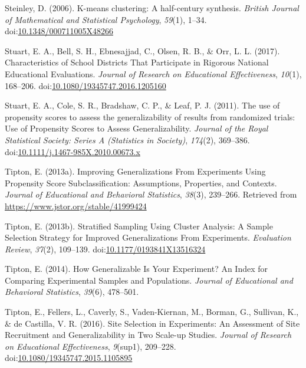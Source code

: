 \documentclass[man,floatsintext]{apa6}
\begin{document}
\leavevmode\hypertarget{ref-steinleyKmeansClusteringHalfcentury2006}{}%
Steinley, D. (2006). K-means clustering: A half-century synthesis. \emph{British Journal of Mathematical and Statistical Psychology}, \emph{59}(1), 1--34. doi:\href{https://doi.org/10.1348/000711005X48266}{10.1348/000711005X48266}

\leavevmode\hypertarget{ref-stuartCharacteristicsSchoolDistricts2017}{}%
Stuart, E. A., Bell, S. H., Ebnesajjad, C., Olsen, R. B., \& Orr, L. L. (2017). Characteristics of School Districts That Participate in Rigorous National Educational Evaluations. \emph{Journal of Research on Educational Effectiveness}, \emph{10}(1), 168--206. doi:\href{https://doi.org/10.1080/19345747.2016.1205160}{10.1080/19345747.2016.1205160}

\leavevmode\hypertarget{ref-stuartUsePropensityScores2011}{}%
Stuart, E. A., Cole, S. R., Bradshaw, C. P., \& Leaf, P. J. (2011). The use of propensity scores to assess the generalizability of results from randomized trials: Use of Propensity Scores to Assess Generalizability. \emph{Journal of the Royal Statistical Society: Series A (Statistics in Society)}, \emph{174}(2), 369--386. doi:\href{https://doi.org/10.1111/j.1467-985X.2010.00673.x}{10.1111/j.1467-985X.2010.00673.x}

\leavevmode\hypertarget{ref-tiptonImprovingGeneralizationsExperiments2013}{}%
Tipton, E. (2013a). Improving Generalizations From Experiments Using Propensity Score Subclassification: Assumptions, Properties, and Contexts. \emph{Journal of Educational and Behavioral Statistics}, \emph{38}(3), 239--266. Retrieved from \url{https://www.jstor.org/stable/41999424}

\leavevmode\hypertarget{ref-tiptonStratifiedSamplingUsing2013}{}%
Tipton, E. (2013b). Stratified Sampling Using Cluster Analysis: A Sample Selection Strategy for Improved Generalizations From Experiments. \emph{Evaluation Review}, \emph{37}(2), 109--139. doi:\href{https://doi.org/10.1177/0193841X13516324}{10.1177/0193841X13516324}

\leavevmode\hypertarget{ref-tiptonHowGeneralizableYour2014}{}%
Tipton, E. (2014). How Generalizable Is Your Experiment? An Index for Comparing Experimental Samples and Populations. \emph{Journal of Educational and Behavioral Statistics}, \emph{39}(6), 478--501.

\leavevmode\hypertarget{ref-tiptonSiteSelectionExperiments2016}{}%
Tipton, E., Fellers, L., Caverly, S., Vaden-Kiernan, M., Borman, G., Sullivan, K., \& de Castilla, V. R. (2016). Site Selection in Experiments: An Assessment of Site Recruitment and Generalizability in Two Scale-up Studies. \emph{Journal of Research on Educational Effectiveness}, \emph{9}(sup1), 209--228. doi:\href{https://doi.org/10.1080/19345747.2015.1105895}{10.1080/19345747.2015.1105895}
\end{document}
